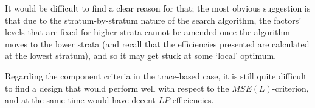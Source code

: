 It would be difficult to find a clear reason for that; the most obvious suggestion is that due to the stratum-by-stratum nature of the search algorithm, the factors' levels that are fixed for higher strata cannot be amended once the algorithm moves to the lower strata (and recall that the efficiencies presented are calculated at the lowest stratum), and so it may get stuck at some `local' optimum.  

Regarding the component criteria in the trace-based case, it is still quite difficult to find a design that would perform well with respect to the $MSE(L)$-criterion, and at the same time would have decent $LP$-efficiencies.      
 

\begin{table}[h]
\centering
\caption{Example 3. Properties of MSE(L)-optimal designs}
\label{tab::mseL_ex3}
\end{table}
